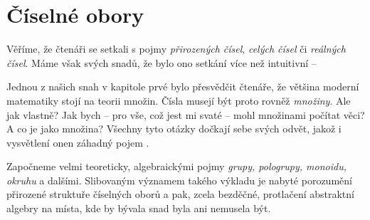 \chapter{Číselné obory}
\label{chap:ciselne-obory}

Věříme, že čtenáři se setkali s pojmy \emph{přirozených čísel}, \emph{celých
čísel} či \emph{reálných čísel}. Máme však svých snadů, že bylo ono setkání více
než intuitivní -- 

Jednou z našich snah v kapitole prvé bylo přesvědčit čtenáře, že většina moderní
matematiky stojí na teorii množin. Čísla musejí být proto rovněž \emph{množiny}.
Ale jak vlastně? Jak bych -- pro vše, což jest mi svaté -- mohl množinami
počítat věci? A co je jako  množina? Všechny tyto otázky dočkají
sebe svých odvět, jakož i vysvětlení onen záhadný pojem .

Započneme velmi teoreticky, algebraickými pojmy \emph{grupy, pologrupy, monoidu,
okruhu} a dalšími. Slibovaným významem takého výkladu je nabyté porozumění
přirozené struktuře číselných oborů a pak, zcela bezděčné, protlačení abstraktní
algebry na místa, kde by bývala snad byla ani nemusela být.



